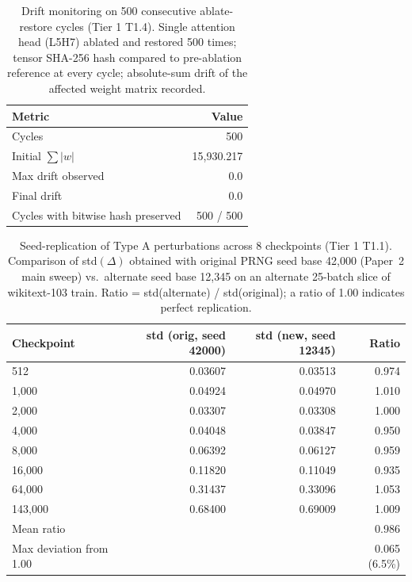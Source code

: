 \documentclass{article}
\begin{document}
\begin{table}[h]
\centering
\caption{Drift monitoring on 500 consecutive ablate-restore cycles (Tier 1 T1.4). Single attention head (L5H7) ablated and restored 500 times; tensor SHA-256 hash compared to pre-ablation reference at every cycle; absolute-sum drift of the affected weight matrix recorded.}
\label{tab:tier1_drift}
\begin{tabular}{lr}
\toprule
Metric & Value \\
\midrule
Cycles & 500 \\
Initial $\sum |w|$ & 15{,}930.217 \\
Max drift observed & $0.0$ \\
Final drift & $0.0$ \\
Cycles with bitwise hash preserved & 500 / 500 \\
\bottomrule
\end{tabular}
\end{table}

\begin{table}[h]
\centering
\caption{Seed-replication of Type A perturbations across 8 checkpoints (Tier 1 T1.1). Comparison of std$(\Delta)$ obtained with original PRNG seed base 42{,}000 (Paper~2 main sweep) vs.\ alternate seed base 12{,}345 on an alternate 25-batch slice of wikitext-103 train. Ratio = std(alternate) / std(original); a ratio of 1.00 indicates perfect replication.}
\label{tab:tier1_seed}
\begin{tabular}{lrrr}
\toprule
Checkpoint & std (orig, seed 42000) & std (new, seed 12345) & Ratio \\
\midrule
512      & 0.03607 & 0.03513 & 0.974 \\
1{,}000  & 0.04924 & 0.04970 & 1.010 \\
2{,}000  & 0.03307 & 0.03308 & 1.000 \\
4{,}000  & 0.04048 & 0.03847 & 0.950 \\
8{,}000  & 0.06392 & 0.06127 & 0.959 \\
16{,}000 & 0.11820 & 0.11049 & 0.935 \\
64{,}000 & 0.31437 & 0.33096 & 1.053 \\
143{,}000 & 0.68400 & 0.69009 & 1.009 \\
\midrule
Mean ratio & & & 0.986 \\
Max deviation from 1.00 & & & 0.065 (6.5\%) \\
\bottomrule
\end{tabular}
\end{table}
\end{document}
